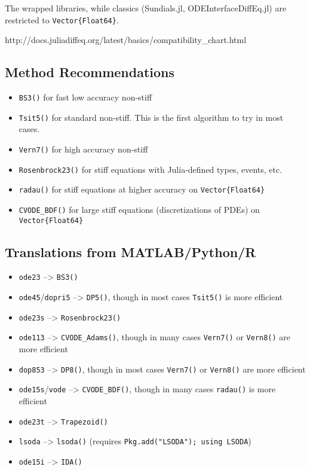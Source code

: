 \documentclass[11pt]{article}
\begin{document}
The wrapped libraries, while classics (Sundials.jl,
ODEInterfaceDiffEq.jl) are restricted to \texttt{Vector\{Float64\}}.

http://docs.juliadiffeq.org/latest/basics/compatibility\_chart.html

    \subsection{Method Recommendations}\label{method-recommendations}

\begin{itemize}
\itemsep1pt\parskip0pt
\item
  \texttt{BS3()} for fast low accuracy non-stiff
\item
  \texttt{Tsit5()} for standard non-stiff. This is the first algorithm
  to try in most cases.
\item
  \texttt{Vern7()} for high accuracy non-stiff
\item
  \texttt{Rosenbrock23()} for stiff equations with Julia-defined types,
  events, etc.
\item
  \texttt{radau()} for stiff equations at higher accuracy on
  \texttt{Vector\{Float64\}}
\item
  \texttt{CVODE\_BDF()} for large stiff equations (discretizations of
  PDEs) on \texttt{Vector\{Float64\}}
\end{itemize}

    \subsection{Translations from
MATLAB/Python/R}\label{translations-from-matlabpythonr}

\begin{itemize}
\itemsep1pt\parskip0pt
\item
  \texttt{ode23} --\textgreater{} \texttt{BS3()}
\item
  \texttt{ode45}/\texttt{dopri5} --\textgreater{} \texttt{DP5()}, though
  in most cases \texttt{Tsit5()} is more efficient
\item
  \texttt{ode23s} --\textgreater{} \texttt{Rosenbrock23()}
\item
  \texttt{ode113} --\textgreater{} \texttt{CVODE\_Adams()}, though in
  many cases \texttt{Vern7()} or \texttt{Vern8()} are more efficient
\item
  \texttt{dop853} --\textgreater{} \texttt{DP8()}, though in most cases
  \texttt{Vern7()} or \texttt{Vern8()} are more efficient
\item
  \texttt{ode15s}/\texttt{vode} --\textgreater{} \texttt{CVODE\_BDF()},
  though in many cases \texttt{radau()} is more efficient
\item
  \texttt{ode23t} --\textgreater{} \texttt{Trapezoid()}
\item
  \texttt{lsoda} --\textgreater{} \texttt{lsoda()} (requires
  \texttt{Pkg.add("LSODA"); using LSODA})
\item
  \texttt{ode15i} --\textgreater{} \texttt{IDA()}
\end{itemize}
\end{document}

